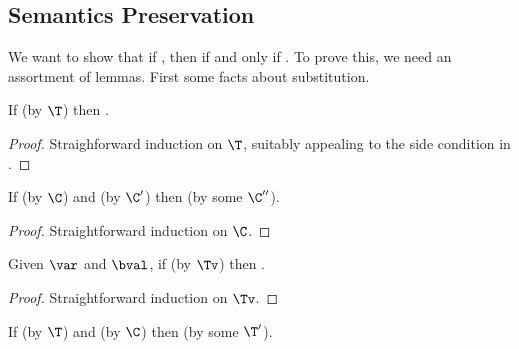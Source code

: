 \subsection{Semantics Preservation}

We want to show that if \trahb{\hbctx}{\envnil}{\bexp}{\hexp}, then \hev{\hexp}{\n{\nat}} if and only if \bev{\envnil}{\bexp}{\n{\nat}}.
To prove this, we need an assortment of lemmas.
First some facts about substitution.

\begin{lemma}[Shadowing]
\label{lem:shadowing}
If \trahb{\hbctx}{\benvext \envcons \var}{\bexp}{\hexp} (by $\T$) then \trahb{\hbctx}{\sub{\benvext}{\bval}{\var} \envcons \var}{\bexp}{\hexp}.
\end{lemma}

\begin{proof}
Straighforward induction on $\T$, suitably appealing to the side condition in .
\end{proof}

\begin{lemma}
\label{lem:substitution-cor}
If \corhb{\hbxtx}{\bvalext}{\hexp} (by $\C$) and  (by $\C'$) then  (by some $\C''$).
\end{lemma}

\begin{proof}
Straightforward induction on $\C$.
\end{proof}

\begin{lemma}
\label{lem:substitution-lookup}
Given $\var$ and $\bval$, if  (by $\Tv$) then .
\end{lemma}

\begin{proof}
Straightforward induction on $\Tv$.
\end{proof}

\begin{lemma}
\label{lem:substitution-trans}
If \trahb{\hbctx}{\benvext}{\bexp}{\hexp} (by $\T$) and \corhb{\hbctx}{\bval}{\hval} (by $\C$) then \trahb{\hbctx}{\sub{\benvext}{\bval}{\var}}{\bexp}{\sub{\hexp}{\hval}{\var}} (by some $\T'$).
\end{lemma}

